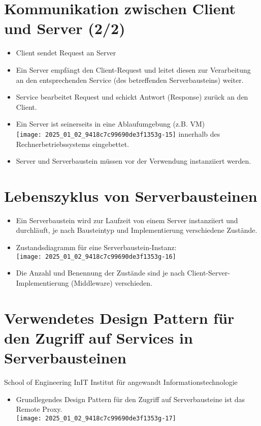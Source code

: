 \documentclass[10pt]{article}
\begin{document}
\section*{Kommunikation zwischen Client und Server (2/2)}
\begin{itemize}
  \item Client sendet Request an Server
  \item Ein Server empfängt den Client-Request und leitet diesen zur Verarbeitung an den entsprechenden Service (des betreffenden Serverbausteins) weiter.
  \item Service bearbeitet Request und schickt Antwort (Response) zurück an den Client.
  \item Ein Server ist seinerseits in eine Ablaufumgebung (z.B. VM)\\
\texttt{[image: 2025\_01\_02\_9418c7c99690de3f1353g-15]} innerhalb des Rechnerbetriebssystems eingebettet.
  \item Server und Serverbaustein müssen vor der Verwendung instanziiert werden.
\end{itemize}

\section*{Lebenszyklus von Serverbausteinen}
\begin{itemize}
  \item Ein Serverbaustein wird zur Laufzeit von einem Server instanziiert und durchläuft, je nach Bausteintyp und Implementierung verschiedene Zustände.
  \item Zustandsdiagramm für eine Serverbaustein-Instanz:\\
\texttt{[image: 2025\_01\_02\_9418c7c99690de3f1353g-16]}
  \item Die Anzahl und Benennung der Zustände sind je nach Client-Server-Implementierung (Middleware) verschieden.
\end{itemize}

\section*{Verwendetes Design Pattern für den Zugriff auf Services in Serverbausteinen}
School of Engineering InIT Institut für angewandt Informationstechnologie

\begin{itemize}
  \item Grundlegendes Design Pattern für den Zugriff auf Serverbausteine ist das Remote Proxy.\\
\texttt{[image: 2025\_01\_02\_9418c7c99690de3f1353g-17]}
\end{itemize}
\end{document}

